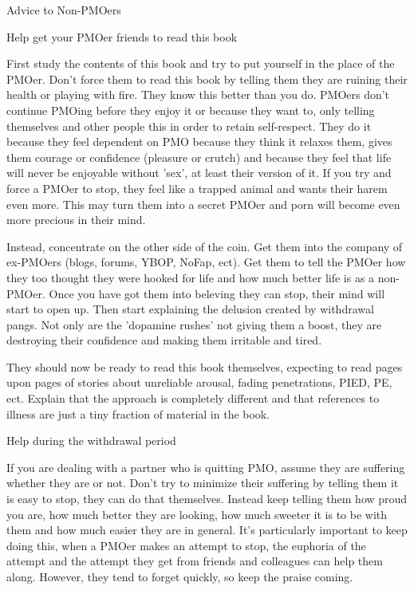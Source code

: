 Advice to Non-PMOers

Help get your PMOer friends to read this book

First study the contents of this book and try to put yourself in the place of the PMOer. Don't force them to read this book by telling them they are ruining their health or playing with fire. They know this better than you do. PMOers don't continue PMOing before they enjoy it or because they want to, only telling themselves and other people this in order to retain self-respect. They do it because they feel dependent on PMO because they think it relaxes them, gives them courage or confidence (pleasure or crutch) and because they feel that life will never be enjoyable without 'sex', at least their version of it. If you try and force a PMOer to stop, they feel like a trapped animal and wants their harem even more. This may turn them into a secret PMOer and porn will become even more precious in their mind.

Instead, concentrate on the other side of the coin. Get them into the company of ex-PMOers (blogs, forums, YBOP, NoFap, ect). Get them to tell the PMOer how they too thought they were hooked for life and how much better life is as a non-PMOer. Once you have got them into beleving they can stop, their mind will start to open up. Then start explaining the delusion created by withdrawal pangs. Not only are the 'dopamine rushes' not giving them a boost, they are destroying their confidence and making them irritable and tired.

They should now be ready to read this book themselves, expecting to read pages upon pages of stories about unreliable arousal, fading penetrations, PIED, PE, ect. Explain that the approach is completely different and that references to illness are just a tiny fraction of material in the book.

Help during the withdrawal period

If you are dealing with a partner who is quitting PMO, assume they are suffering whether they are or not. Don't try to minimize their suffering by telling them it is easy to stop, they can do that themselves. Instead keep telling them how proud you are, how much better they are looking, how much sweeter it is to be with them and how much easier they are in general. It's particularly important to keep doing this, when a PMOer makes an attempt to stop, the euphoria of the attempt and the attempt they get from friends and colleagues can help them along. However, they tend to forget quickly, so keep the praise coming.

